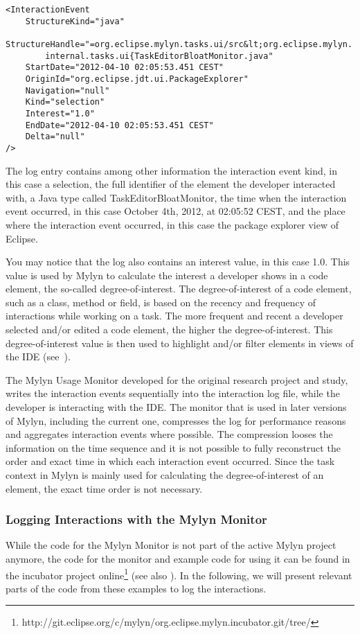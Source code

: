 \begin{lstlisting}
<InteractionEvent 
    StructureKind="java"
    StructureHandle="=org.eclipse.mylyn.tasks.ui/src&lt;org.eclipse.mylyn.
        internal.tasks.ui{TaskEditorBloatMonitor.java" 
    StartDate="2012-04-10 02:05:53.451 CEST"
    OriginId="org.eclipse.jdt.ui.PackageExplorer" 
    Navigation="null" 
    Kind="selection" 
    Interest="1.0" 
    EndDate="2012-04-10 02:05:53.451 CEST" 
    Delta="null"
/>
\end{lstlisting}

The log entry contains among other information the interaction event kind, in this case a selection, the full identifier of the element the developer interacted with, a Java type called TaskEditorBloatMonitor, the time when the interaction event occurred, in this case October 4th, 2012, at 02:05:52 CEST, and the place where the interaction event occurred, in this case the package explorer view of Eclipse. 

You may notice that the log also contains an interest value, in this case 1.0. This value is used by Mylyn to calculate the interest a developer shows in a code element, the so-called degree-of-interest. The degree-of-interest of a code element, such as a class, method or field, is based on the recency and frequency of interactions while working on a task. The more frequent and recent a developer selected and/or edited a code element, the higher the degree-of-interest. This degree-of-interest value is then used to highlight and/or filter elements in views of the IDE (see~\cite{kersten2007focusing,Kersten-Mylin}).

The Mylyn Usage Monitor developed for the original research project and study, writes the interaction events sequentially into the interaction log file, while the developer is interacting with the IDE. The monitor that is used in later versions of Mylyn, including the current one, compresses the log for performance reasons and aggregates interaction events where possible. The compression looses the information on the time sequence and it is not possible to fully reconstruct the order and exact time in which each interaction event occurred. Since the task context in Mylyn is mainly used for calculating the degree-of-interest of an element, the exact time order is not necessary.


\subsubsection{Logging Interactions with the Mylyn Monitor}
While the code for the Mylyn Monitor is not part of the active Mylyn project anymore, the code for the monitor and example code for using it can be found in the incubator project online\footnote{http://git.eclipse.org/c/mylyn/org.eclipse.mylyn.incubator.git/tree/} (see also \cite{mylyn-monitor}). In the following, we will present relevant parts of the code from these examples to log the interactions.

